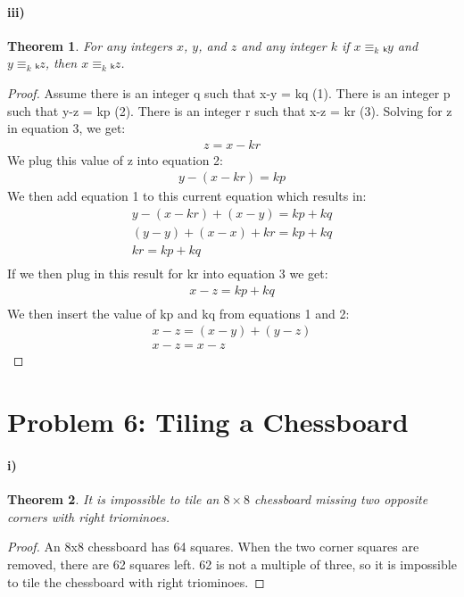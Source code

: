 \documentclass[10pt,letter]{article}
\newtheorem*{thm}{Theorem}
\begin{document}
\paragraph{iii)}
\begin{thm}
  For any integers $x$, $y$, and $z$ and any integer $k$ if $x \equiv_kₖ y$ and $y \equiv_kₖ z$, then $x \equiv_kₖ z$.
\end{thm}
\begin{proof}
Assume there is an integer q such that x-y = kq (1). There is an integer p such that y-z = kp (2). There is an integer r such that x-z = kr (3). Solving for z in equation 3, we get:\\
  \begin{align*}z = x -kr  \end{align*}
We plug this value of z into equation 2:
  \begin{align*}y-(x-kr)=kp  \end{align*}
We then add equation 1 to this  current equation which results in:
  \begin{align*}
y-(x-kr) + (x-y)=kp + kq\\
(y-y) + (x-x) + kr = kp + kq \\
kr = kp + kq \\
  \end{align*}
If we then plug in this result for kr into equation 3  we get: 
\begin{align*}
x-z = kp + kq\\
 \end{align*}
We then insert the value of kp and kq from equations 1 and 2:
 \begin{align*}
x-z = (x-y) + (y-z) \\
x-z = x-z 
 \end{align*}
\end{proof}

\section*{Problem 6: Tiling a Chessboard}
\paragraph{i)}
\begin{thm} It is impossible to tile an $8 \times 8$ chessboard missing two opposite corners with right triominoes.
\end{thm}
\begin{proof}
  An 8x8 chessboard has 64 squares. When the two corner squares are removed, there are 62 squares left. 62 is not a multiple of three, so it is impossible to tile the chessboard with right triominoes.
\end{proof}
\end{document}
